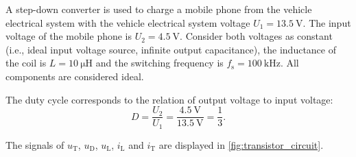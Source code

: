 
A step-down converter is used to charge a mobile phone from the vehicle electrical system with the vehicle electrical system voltage $U_1 = \SI{13.5}{\volt}$. The input voltage of the mobile phone is $U_2 = \SI{4.5}{\volt}$. Consider both voltages as constant (i.e., ideal input voltage source, infinite output capacitance), the inductance of the coil is $L = \SI{10}{\micro\henry}$ and the switching frequency is $f_\mathrm{s} = \SI{ 100}{\kilo\hertz}$. All components are considered ideal.




\begin{solutionblock}

	

\end{solutionblock}

\begin{solutionblock}
	The duty cycle corresponds to the relation of output voltage to input voltage:
	\begin{equation}
		D = \frac{U_2}{U_1} = \frac{\SI{ 4.5}{\volt}}{\SI{ 13.5}{\volt}} = \frac{1}{3}.
	\end{equation}
\end{solutionblock}

\begin{solutionblock} %
	The signals of $u_\mathrm{T}$, $u_\mathrm{D}$, $u_\mathrm{L}$, $i_\mathrm{L}$ and $i_\mathrm{T}$ are displayed in \autoref{fig:transistor_circuit}.

	

\end{solutionblock}

